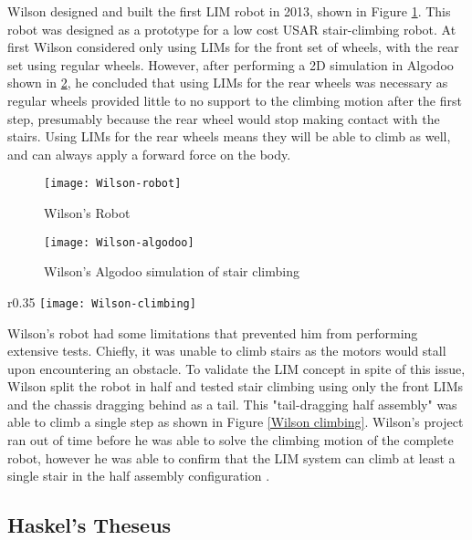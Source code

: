 Wilson designed and built the first LIM robot in 2013, shown in Figure \ref{Wilson robot}. This robot was designed as a prototype for a low cost USAR stair-climbing robot. At first Wilson considered only using LIMs for the front set of wheels, with the rear set using regular wheels. However, after performing a 2D simulation in Algodoo shown in \ref{Wilson algodoo}, he concluded that using LIMs for the rear wheels was necessary as regular wheels provided little to no support to the climbing motion after the first step, presumably because the rear wheel would stop making contact with the stairs. Using LIMs for the rear wheels means they will be able to climb as well, and can always apply a forward force on the body.

\begin{figure}[h]
	\centering
	\texttt{[image: Wilson-robot]}
	\caption{Wilson's Robot \citep{Wilson-2013}}
	\label{Wilson robot}
\end{figure}

\begin{figure}[h]
	\centering
	\texttt{[image: Wilson-algodoo]}
	\caption{Wilson's Algodoo simulation of stair climbing \citep{Wilson-2013}}
	\label{Wilson algodoo}
\end{figure}

\begin{wrapfigure}{r}{0.35\textwidth} %
	\centering
	\texttt{[image: Wilson-climbing]}
	\caption{Wilson's half assembly climbing a stair \citep{Wilson-2013}}
	\label{Wilson climbing}
\end{wrapfigure}

Wilson's robot had some limitations that prevented him from performing extensive tests. Chiefly, it was unable to climb stairs as the motors would stall upon encountering an obstacle. To validate the LIM concept in spite of this issue, Wilson split the robot in half and tested stair climbing using only the front LIMs and the chassis dragging behind as a tail. This "tail-dragging half assembly" was able to climb a single step as shown in Figure \ref{Wilson climbing}. Wilson's project ran out of time before he was able to solve the climbing motion of the complete robot, however he was able to confirm that the LIM system can climb at least a single stair in the half assembly configuration \citep{Wilson-2013}.

\subsection{Haskel's Theseus} %

